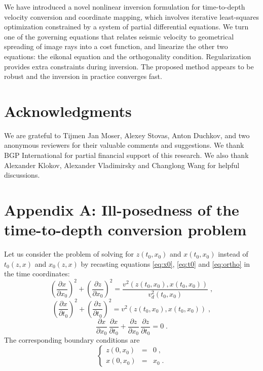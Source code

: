 We have introduced a novel nonlinear inversion formulation for time-to-depth velocity conversion and 
coordinate mapping, which involves iterative least-squares optimization constrained by a system of partial differential 
equations. We turn one of the governing equations that relates seismic velocity to geometrical spreading of image 
rays into a cost function, and linearize the other two equations: the eikonal equation and the orthogonality 
condition. Regularization provides extra constraints during inversion. The 
proposed method appears to be robust and the inversion in practice converges fast.

\section{Acknowledgments}

We are grateful to Tijmen Jan Moser, Alexey Stovas, Anton Duchkov, and two anonymous reviewers for their 
valuable comments and suggestions. We thank BGP International for partial financial support of this research. We 
also thank Alexander Klokov, Alexander Vladimirsky and Changlong Wang for helpful discussions.

\appendix
\section{Appendix A: Ill-posedness of the time-to-depth conversion problem}

Let us consider the problem of solving for $z (t_0,x_0)$ and $x (t_0,x_0)$ instead of 
$t_0 (z,x)$ and $x_0 (z,x)$ by recasting 
equations \ref{eq:x0}, \ref{eq:t0} and \ref{eq:ortho} in the time coordinates:
\begin{equation}
\label{eq:igradx}
\left(\frac{\partial x}{\partial x_0}\right)^2 + 
\left(\frac{\partial z}{\partial x_0}\right)^2 
= \frac{v^2 (z (t_0,x_0), x (t_0,x_0))}{v_d^2 (t_0,x_0)}\;,
\end{equation}
\begin{equation}
\label{eq:igradt}
\left(\frac{\partial x}{\partial t_0}\right)^2 + 
\left(\frac{\partial z}{\partial t_0}\right)^2 
= v^2 (z (t_0,x_0), x (t_0,x_0))\;, 
\end{equation}
\begin{equation}
\label{eq:idotp}
\frac{\partial x}{\partial x_0}\,\frac{\partial x}{\partial t_0} + 
\frac{\partial z}{\partial x_0}\,\frac{\partial z}{\partial t_0} 
= 0\;.
\end{equation}
The corresponding boundary conditions are
\begin{equation}
\label{eq:ixb}
\left\{ \begin{array}{lcl}
z (0, x_0) & = & 0\;, \\
x (0, x_0) & = & x_0\;.
\end{array} \right.
\end{equation}

